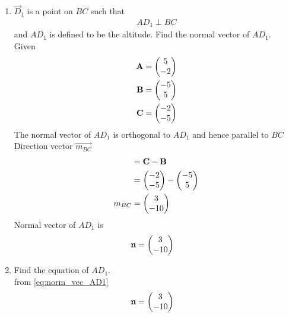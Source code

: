 \documentclass[11pt]{book}
\begin{document}
\begin{enumerate}[label=\thesection.\arabic*.,ref=\thesection.\theenumi]

\item $\vec{D}_1$ is a point on $BC$ such that
\begin{align}
AD_1 \perp BC
\end{align}
and $AD_1$ is defined to be the altitude. Find the normal vector of $AD_1$.
  \\   \solution Given  \\
  \begin{align} 
 \mathbf{A} &= \begin{pmatrix} 5\\ -2 \end{pmatrix} \\ \mathbf{B} &= \begin{pmatrix} -5\\ 5 \end{pmatrix}
  \\\mathbf{C} &= \begin{pmatrix} -2\\ -5\end{pmatrix}
 \end{align}
The normal vector of $AD_{1}$ is orthogonal to $AD_1$ and hence parallel to $BC$ \\ Direction vector $\vec{m_{BC}}$ 
\begin{align}
    &=\mathbf{C}-\mathbf{B}\\
    &=\begin{pmatrix}-2 \\ -5\end{pmatrix} -\begin{pmatrix}-5 \\5\end{pmatrix} \\
    m_{BC} &= \begin{pmatrix}3 \\ -10\end{pmatrix}
\end{align}
Normal vector of $AD_1$ is
\begin{align}
\label{eq:norm_vec_AD1}
	\vec{n} &= 
\myvec{3\\-10}
\end{align}

\item Find the equation of $AD_1$.
 \\    \solution from \eqref{eq:norm_vec_AD1} 
 \begin{align}
	\mathbf{n} &= 
\begin{pmatrix}3\\-10\end{pmatrix}
\end{align}


\end{enumerate}
\end{document}
